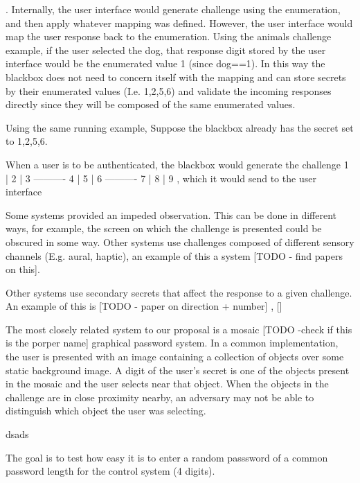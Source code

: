 \documentclass[12pt]{document}
\begin{document}
\begin{Introduction}
\begin{SCRAP -layman}
. Internally, the user interface would generate challenge using the enumeration, and then apply whatever mapping was defined. However, the user interface would map the user response back to the enumeration.
Using the animals challenge example, if the user selected the dog, that response digit stored by the user interface would be the enumerated value 1 (since dog==1).
In this way the blackbox does not need to concern itself with the mapping and can store secrets by their enumerated values (I.e. {1,2,5,6}) and validate the incoming responses directly since they will be composed of the same enumerated values.

Using the same running example,
Suppose the blackbox already has the secret set to {1,2,5,6}.

When a user is to be authenticated, the blackbox would generate the challenge
1 | 2 | 3
----------
4 | 5 | 6
----------
7 | 8 | 9
, which it would send to the user interface



\begin{Related Work}
Some systems provided an impeded observation. This can be done in different ways, for example, the screen on which the challenge is presented could be obscured in some way. Other systems use challenges composed of different sensory channels (E.g. aural, haptic), 
an example of this a system [TODO - find papers on this].

Other systems use secondary secrets that affect the response to a given challenge. An example of this is [TODO - paper on direction + number] , []

The most closely related system to our proposal is a mosaic [TODO -check if this is the porper name]  graphical password system. In a common implementation, the user is presented with an image containing a collection of objects over some static background image.
A digit of the user's secret is one of the objects present in the mosaic and the user selects near that object. When the objects in the challenge are in close proximity nearby, an adversary may not be able to distinguish which object the user was selecting.


\begin{Methodology}

\begin{Theory}

\begin{Implementation}
dsads

\begin{Usability Study}
The goal is to test how easy it is to enter a random passsword of a common password length for the control system (4 digits).





\end{Usability Study}
\end{Implementation}
\end{Theory}
\end{Methodology}
\end{Related Work}
\end{SCRAP -layman}
\end{Introduction}
\end{document}
